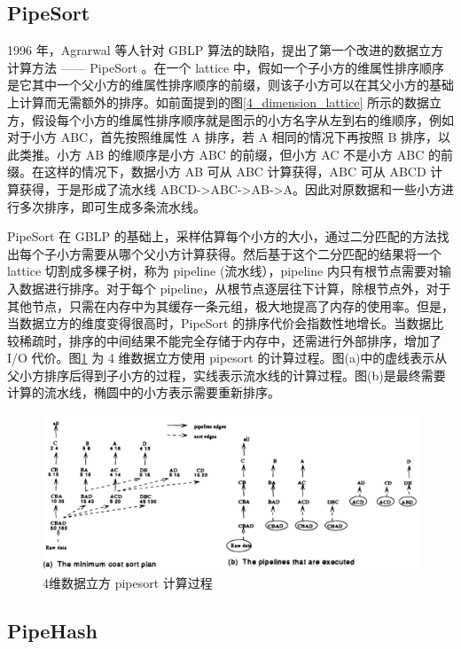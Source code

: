 \subsection{PipeSort}

1996 年，Agrarwal 等人针对 GBLP 算法的缺陷，提出了第一个改进的数据立方计算方法 —— PipeSort\cite{agarwal1996computation} 。在一个 lattice 中，假如一个子小方的维属性排序顺序是它其中一个父小方的维属性排序顺序的前缀，则该子小方可以在其父小方的基础上计算而无需额外的排序。如前面提到的图\ref{4_dimension_lattice} 所示的数据立方，假设每个小方的维属性排序顺序就是图示的小方名字从左到右的维顺序，例如对于小方 ABC，首先按照维属性 A 排序，若 A 相同的情况下再按照 B 排序，以此类推。小方 AB 的维顺序是小方 ABC 的前缀，但小方 AC 不是小方 ABC 的前缀。在这样的情况下，数据小方 AB 可从 ABC 计算获得，ABC 可从 ABCD 计算获得，于是形成了流水线 ABCD-\textgreater ABC-\textgreater AB-\textgreater A。因此对原数据和一些小方进行多次排序，即可生成多条流水线。

PipeSort 在 GBLP 的基础上，采样估算每个小方的大小，通过二分匹配的方法找出每个子小方需要从哪个父小方计算获得。然后基于这个二分匹配的结果将一个 lattice 切割成多棵子树，称为 pipeline (流水线），pipeline 内只有根节点需要对输入数据进行排序。对于每个 pipeline，从根节点逐层往下计算，除根节点外，对于其他节点，只需在内存中为其缓存一条元组，极大地提高了内存的使用率。但是，当数据立方的维度变得很高时，PipeSort 的排序代价会指数性地增长。当数据比较稀疏时，排序的中间结果不能完全存储于内存中，还需进行外部排序，增加了 I/O 代价。图\ref{pipesort} 为 4 维数据立方使用 pipesort 的计算过程。图(a)中的虚线表示从父小方排序后得到子小方的过程，实线表示流水线的计算过程。图(b)是最终需要计算的流水线，椭圆中的小方表示需要重新排序。


\begin{figure}[!htb]
\centering\includegraphics[width=5in]{picture/ch_current_research/pipesort} 
\caption{4维数据立方 pipesort 计算过程}\label{pipesort} 
\end{figure} 

\subsection{PipeHash}

